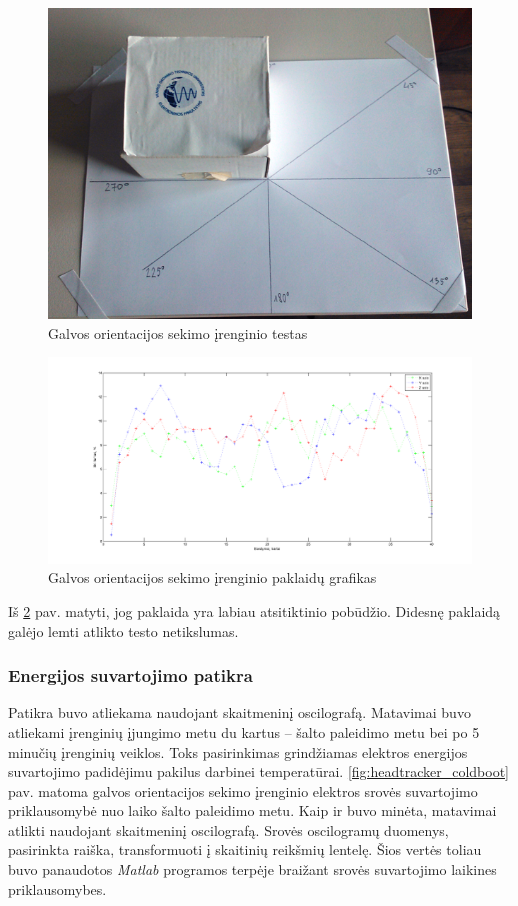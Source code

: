 \documentclass[]{vgtuef}
\begin{document}
\begin{figure}[htbp]
  \centering
  \includegraphics[width=450px]{img/head_tracker_testas.png}
  \caption{Galvos orientacijos sekimo įrenginio testas}
  \label{fig:headtracker_test2}
\end{figure}

\begin{figure}[htbp]
  \centering
  \includegraphics[width=450px]{img/kampai.png}
  \caption{Galvos orientacijos sekimo įrenginio paklaidų grafikas}
  \label{fig:headtracker_test3}
\end{figure}

Iš \ref{fig:headtracker_test3} pav. matyti, jog paklaida yra labiau atsitiktinio pobūdžio. Didesnę paklaidą galėjo lemti atlikto testo netikslumas.

\subsubsection{Energijos suvartojimo patikra}

Patikra buvo atliekama naudojant skaitmeninį oscilografą. Matavimai buvo atliekami įrenginių įjungimo metu du kartus -- šalto paleidimo metu bei po 5 minučių įrenginių veiklos. Toks pasirinkimas grindžiamas elektros energijos suvartojimo padidėjimu pakilus darbinei temperatūrai. \ref{fig:headtracker_coldboot} pav. matoma galvos orientacijos sekimo įrenginio elektros srovės suvartojimo priklausomybė nuo laiko šalto paleidimo metu. Kaip ir buvo minėta, matavimai atlikti naudojant skaitmeninį oscilografą. Srovės oscilogramų duomenys, pasirinkta raiška, transformuoti į skaitinių reikšmių lentelę. Šios vertės toliau buvo panaudotos \textit{Matlab} programos terpėje braižant srovės suvartojimo laikines priklausomybes.
\end{document}
